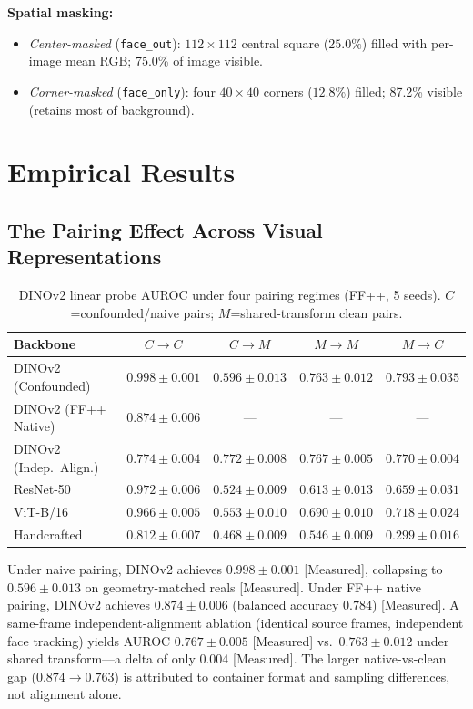 \documentclass[10pt,twocolumn]{article}
\begin{document}
\textbf{Spatial masking:}
\begin{itemize}[leftmargin=*]
\item \emph{Center-masked} (\texttt{face\_out}): $112 \times 112$ central square ($25.0\%$) filled with per-image mean RGB; 75.0\% of image visible.
\item \emph{Corner-masked} (\texttt{face\_only}): four $40 \times 40$ corners ($12.8\%$) filled; 87.2\% visible (retains most of background).
\end{itemize}

\section{Empirical Results}

\subsection{The Pairing Effect Across Visual Representations}

\begin{table}[h]
\small
\centering
\caption{DINOv2 linear probe AUROC under four pairing regimes (FF++, 5 seeds).
$C$=confounded/naive pairs; $M$=shared-transform clean pairs.}
\begin{tabular}{lcccc}
\toprule
Backbone & $C{\to}C$ & $C{\to}M$ & $M{\to}M$ & $M{\to}C$ \\
\midrule
DINOv2 (Confounded) & $0.998\pm0.001$ & $0.596\pm0.013$ & $0.763\pm0.012$ & $0.793\pm0.035$ \\
DINOv2 (FF++ Native) & $0.874\pm0.006$ & --- & --- & --- \\
DINOv2 (Indep.\ Align.) & $0.774\pm0.004$ & $0.772\pm0.008$ & $0.767\pm0.005$ & $0.770\pm0.004$ \\
ResNet-50 & $0.972\pm0.006$ & $0.524\pm0.009$ & $0.613\pm0.013$ & $0.659\pm0.031$ \\
ViT-B/16 & $0.966\pm0.005$ & $0.553\pm0.010$ & $0.690\pm0.010$ & $0.718\pm0.024$ \\
Handcrafted & $0.812\pm0.007$ & $0.468\pm0.009$ & $0.546\pm0.009$ & $0.299\pm0.016$ \\
\bottomrule
\end{tabular}
\end{table}

Under naive pairing, DINOv2 achieves $0.998 \pm 0.001$ [Measured], collapsing to $0.596 \pm 0.013$ on geometry-matched reals [Measured].
Under FF++ native pairing, DINOv2 achieves $0.874 \pm 0.006$ (balanced accuracy $0.784$) [Measured].
A same-frame independent-alignment ablation (identical source frames, independent face tracking) yields AUROC $0.767 \pm 0.005$ [Measured] vs.\ $0.763 \pm 0.012$ under shared transform---a delta of only $0.004$ [Measured].
The larger native-vs-clean gap ($0.874 \to 0.763$) is attributed to container format and sampling differences, not alignment alone.
\end{document}
